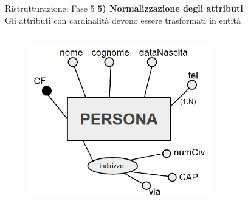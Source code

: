 \begin{frame}{Ristrutturazione: Fase 5}
\textbf{5) Normalizzazione degli attributi}
\\\vspace{2em}
Gli attributi con cardinalit\`a devono essere trasformati in entit\`a
\begin{columns}
        \begin{column}{0.5\textwidth}
            \begin{figure}[h]
        \centering
        \includegraphics[width=0.75\textwidth]{img/i10.png}
    \end{figure}
        \end{column}
        \begin{column}{0.5\textwidth}
        \end{column}
    \end{columns}
\end{frame}
